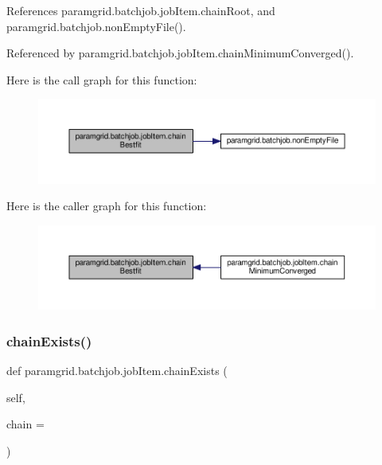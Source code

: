 References paramgrid.\+batchjob.\+job\+Item.\+chain\+Root, and paramgrid.\+batchjob.\+non\+Empty\+File().



Referenced by paramgrid.\+batchjob.\+job\+Item.\+chain\+Minimum\+Converged().

Here is the call graph for this function\+:
\nopagebreak
\begin{figure}[H]
\begin{center}
\leavevmode
\includegraphics[width=350pt]{classparamgrid_1_1batchjob_1_1jobItem_a58c7ab8e50b105e645388b81d0e26f5a_cgraph}
\end{center}
\end{figure}
Here is the caller graph for this function\+:
\nopagebreak
\begin{figure}[H]
\begin{center}
\leavevmode
\includegraphics[width=350pt]{classparamgrid_1_1batchjob_1_1jobItem_a58c7ab8e50b105e645388b81d0e26f5a_icgraph}
\end{center}
\end{figure}
\mbox{\label{classparamgrid_1_1batchjob_1_1jobItem_af221a166a73199e5228a24546e014f87}} 
\subsubsection{\texorpdfstring{chain\+Exists()}{chainExists()}}
{\footnotesize\ttfamily def paramgrid.\+batchjob.\+job\+Item.\+chain\+Exists (\begin{DoxyParamCaption}\item[{}]{self,  }\item[{}]{chain = {} }\end{DoxyParamCaption})}



